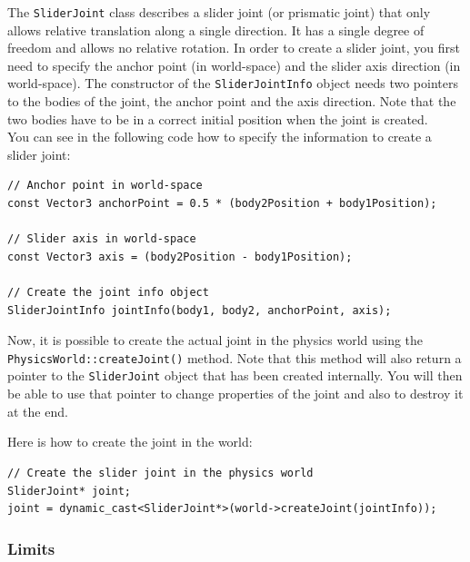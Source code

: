 \documentclass[a4paper,12pt]{article}
\begin{document}
    The \texttt{SliderJoint} class describes a slider joint (or prismatic joint) that only allows relative translation along a single direction. It has a single degree of freedom and allows no
    relative rotation. In order to create a slider joint, you first need to specify the anchor point (in world-space) and the slider axis direction (in world-space). The constructor of the
    \texttt{SliderJointInfo} object needs two pointers to the bodies of the joint, the anchor point and the axis direction. Note that the two bodies have to be in a correct initial position when
    the joint is created. \\

    You can see in the following code how to specify the information to create a slider joint: \\

    \begin{lstlisting}
// Anchor point in world-space
const Vector3 anchorPoint = 0.5 * (body2Position + body1Position);

// Slider axis in world-space
const Vector3 axis = (body2Position - body1Position);

// Create the joint info object
SliderJointInfo jointInfo(body1, body2, anchorPoint, axis);
  \end{lstlisting}

    \vspace{0.6cm}

    \begin{sloppypar}
    Now, it is possible to create the actual joint in the physics world using the \texttt{PhysicsWorld::createJoint()} method.
    Note that this method will also return a pointer to the \texttt{SliderJoint} object that has been created internally. You will then
    be able to use that pointer to change properties of the joint and also to destroy it at the end. \\
    \end{sloppypar}

    Here is how to create the joint in the world: \\

    \begin{lstlisting}
// Create the slider joint in the physics world
SliderJoint* joint;
joint = dynamic_cast<SliderJoint*>(world->createJoint(jointInfo));
  \end{lstlisting}

    \subsubsection{Limits}
\end{document}
